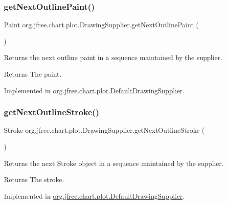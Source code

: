 \subsubsection{\texorpdfstring{get\+Next\+Outline\+Paint()}{getNextOutlinePaint()}}
{\footnotesize\ttfamily Paint org.\+jfree.\+chart.\+plot.\+Drawing\+Supplier.\+get\+Next\+Outline\+Paint (\begin{DoxyParamCaption}{ }\end{DoxyParamCaption})}

Returns the next outline paint in a sequence maintained by the supplier.

\begin{DoxyReturn}{Returns}
The paint. 
\end{DoxyReturn}


Implemented in \mbox{\hyperlink{classorg_1_1jfree_1_1chart_1_1plot_1_1_default_drawing_supplier_ab6d4d685e012ec207b8aa58b926090e2}{org.\+jfree.\+chart.\+plot.\+Default\+Drawing\+Supplier}}.

\mbox{\label{interfaceorg_1_1jfree_1_1chart_1_1plot_1_1_drawing_supplier_aa105b3b934971ebb5fea78e30d41f2fb}} 
\subsubsection{\texorpdfstring{get\+Next\+Outline\+Stroke()}{getNextOutlineStroke()}}
{\footnotesize\ttfamily Stroke org.\+jfree.\+chart.\+plot.\+Drawing\+Supplier.\+get\+Next\+Outline\+Stroke (\begin{DoxyParamCaption}{ }\end{DoxyParamCaption})}

Returns the next {\ttfamily Stroke} object in a sequence maintained by the supplier.

\begin{DoxyReturn}{Returns}
The stroke. 
\end{DoxyReturn}


Implemented in \mbox{\hyperlink{classorg_1_1jfree_1_1chart_1_1plot_1_1_default_drawing_supplier_a09adc92560316dcc9acabb7720a0e910}{org.\+jfree.\+chart.\+plot.\+Default\+Drawing\+Supplier}}.

